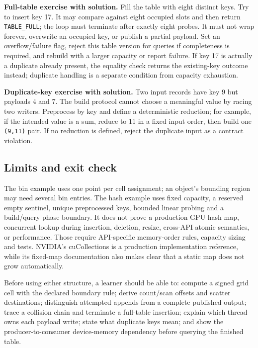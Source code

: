 \textbf{Full-table exercise with solution.} Fill the table with eight distinct keys. Try to insert key 17. It may compare against eight occupied slots and then return \texttt{TABLE\_FULL}; the loop must terminate after exactly eight probes. It must not wrap forever, overwrite an occupied key, or publish a partial payload. Set an overflow/failure flag, reject this table version for queries if completeness is required, and rebuild with a larger capacity or report failure. If key 17 is actually a duplicate already present, the equality check returns the existing-key outcome instead; duplicate handling is a separate condition from capacity exhaustion.

\textbf{Duplicate-key exercise with solution.} Two input records have key 9 but payloads 4 and 7. The build protocol cannot choose a meaningful value by racing two writers. Preprocess by key and define a deterministic reduction; for example, if the intended value is a sum, reduce to 11 in a fixed input order, then build one \texttt{(9,11)} pair. If no reduction is defined, reject the duplicate input as a contract violation.

\subsection{Limits and exit check}\label{03-visual-computing-i-ch016-limits-and-exit-check}

The bin example uses one point per cell assignment; an object's bounding region may need several bin entries. The hash example uses fixed capacity, a reserved empty sentinel, unique preprocessed keys, bounded linear probing and a build/query phase boundary. It does not prove a production GPU hash map, concurrent lookup during insertion, deletion, resize, cross-API atomic semantics, or performance. Those require API-specific memory-order rules, capacity sizing and tests. NVIDIA's cuCollections is a production implementation reference, while its fixed-map documentation also makes clear that a static map does not grow automatically.

Before using either structure, a learner should be able to: compute a signed grid cell with the declared boundary rule; derive count/scan offsets and scatter destinations; distinguish attempted appends from a complete published output; trace a collision chain and terminate a full-table insertion; explain which thread owns each payload write; state what duplicate keys mean; and show the producer-to-consumer device-memory dependency before querying the finished table.

